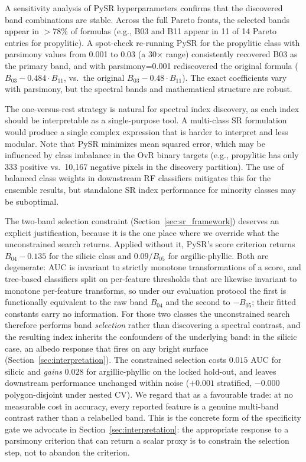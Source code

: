 \documentclass[preprint,authoryear,number]{elsarticle}
\begin{document}
A sensitivity analysis of PySR hyperparameters confirms that the discovered band combinations are stable. Across the full Pareto fronts, the selected bands appear in $>$78\% of formulas (e.g., B03 and B11 appear in 11 of 14 Pareto entries for propylitic). A spot-check re-running PySR for the propylitic class with parsimony values from 0.001 to 0.03 (a 30$\times$ range) consistently recovered B03 as the primary band, and with parsimony=0.001 rediscovered the original formula ($B_{03} - 0.484 \cdot B_{11}$, vs.\ the original $B_{03} - 0.48 \cdot B_{11}$). The exact coefficients vary with parsimony, but the spectral bands and mathematical structure are robust.

The one-versus-rest strategy is natural for spectral index discovery, as each index should be interpretable as a single-purpose tool. A multi-class SR formulation would produce a single complex expression that is harder to interpret and less modular. Note that PySR minimizes mean squared error, which may be influenced by class imbalance in the OvR binary targets (e.g., propylitic has only 333 positive vs.\ 10{,}167 negative pixels in the discovery partition). The use of balanced class weights in downstream RF classifiers mitigates this for the ensemble results, but standalone SR index performance for minority classes may be suboptimal.

The two-band selection constraint (Section~\ref{sec:sr_framework}) deserves an explicit justification, because it is the one place where we override what the unconstrained search returns. Applied without it, PySR's score criterion returns $B_{04} - 0.135$ for the silicic class and $0.09/B_{05}$ for argillic-phyllic. Both are degenerate: AUC is invariant to strictly monotone transformations of a score, and tree-based classifiers split on per-feature thresholds that are likewise invariant to monotone per-feature transforms, so under our evaluation protocol the first is functionally equivalent to the raw band $B_{04}$ and the second to $-B_{05}$; their fitted constants carry no information. For those two classes the unconstrained search therefore performs band \emph{selection} rather than discovering a spectral contrast, and the resulting index inherits the confounders of the underlying band: in the silicic case, an albedo response that fires on any bright surface (Section~\ref{sec:interpretation}). The constrained selection costs $0.015$ AUC for silicic and \emph{gains} $0.028$ for argillic-phyllic on the locked hold-out, and leaves downstream performance unchanged within noise ($+0.001$ stratified, $-0.000$ polygon-disjoint under nested CV). We regard that as a favourable trade: at no measurable cost in accuracy, every reported feature is a genuine multi-band contrast rather than a relabelled band. This is the concrete form of the specificity gate we advocate in Section~\ref{sec:interpretation}: the appropriate response to a parsimony criterion that can return a scalar proxy is to constrain the selection step, not to abandon the criterion.
\end{document}
